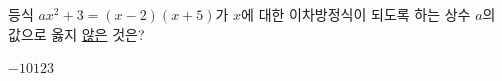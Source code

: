 등식 $ax^2+3=(x-2)(x+5)$가 $x$에 대한 이차방정식이 되도록 하는 상수 $a$의 값으로 옳지 \underline{않은} 것은?
\begin{choices32}{$-1$}{$0$}{$1$}{$2$}{$3$}\end{choices32}
